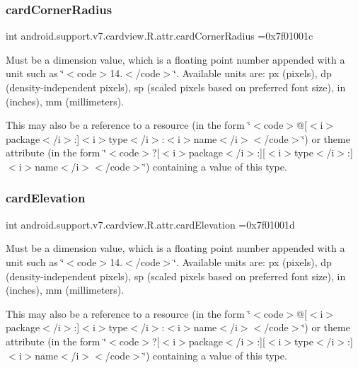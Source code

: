 \subsubsection{\texorpdfstring{card\+Corner\+Radius}{cardCornerRadius}}
{\footnotesize\ttfamily int android.\+support.\+v7.\+cardview.\+R.\+attr.\+card\+Corner\+Radius =0x7f01001c\hspace{0.3cm}{\ttfamily [static]}}

Must be a dimension value, which is a floating point number appended with a unit such as \char`\"{}$<$code$>$14.\+5sp$<$/code$>$\char`\"{}. Available units are\+: px (pixels), dp (density-\/independent pixels), sp (scaled pixels based on preferred font size), in (inches), mm (millimeters). 

This may also be a reference to a resource (in the form \char`\"{}$<$code$>$@\mbox{[}$<$i$>$package$<$/i$>$\+:\mbox{]}$<$i$>$type$<$/i$>$\+:$<$i$>$name$<$/i$>$$<$/code$>$\char`\"{}) or theme attribute (in the form \char`\"{}$<$code$>$?\mbox{[}$<$i$>$package$<$/i$>$\+:\mbox{]}\mbox{[}$<$i$>$type$<$/i$>$\+:\mbox{]}$<$i$>$name$<$/i$>$$<$/code$>$\char`\"{}) containing a value of this type. \mbox{\label{classandroid_1_1support_1_1v7_1_1cardview_1_1R_1_1attr_aee945e311bc98e30cd1e2812a35a3d55}} 
\subsubsection{\texorpdfstring{card\+Elevation}{cardElevation}}
{\footnotesize\ttfamily int android.\+support.\+v7.\+cardview.\+R.\+attr.\+card\+Elevation =0x7f01001d\hspace{0.3cm}{\ttfamily [static]}}

Must be a dimension value, which is a floating point number appended with a unit such as \char`\"{}$<$code$>$14.\+5sp$<$/code$>$\char`\"{}. Available units are\+: px (pixels), dp (density-\/independent pixels), sp (scaled pixels based on preferred font size), in (inches), mm (millimeters). 

This may also be a reference to a resource (in the form \char`\"{}$<$code$>$@\mbox{[}$<$i$>$package$<$/i$>$\+:\mbox{]}$<$i$>$type$<$/i$>$\+:$<$i$>$name$<$/i$>$$<$/code$>$\char`\"{}) or theme attribute (in the form \char`\"{}$<$code$>$?\mbox{[}$<$i$>$package$<$/i$>$\+:\mbox{]}\mbox{[}$<$i$>$type$<$/i$>$\+:\mbox{]}$<$i$>$name$<$/i$>$$<$/code$>$\char`\"{}) containing a value of this type. \mbox{\label{classandroid_1_1support_1_1v7_1_1cardview_1_1R_1_1attr_a2176e51c58a1dfdee83e66e3f956d643}} 
